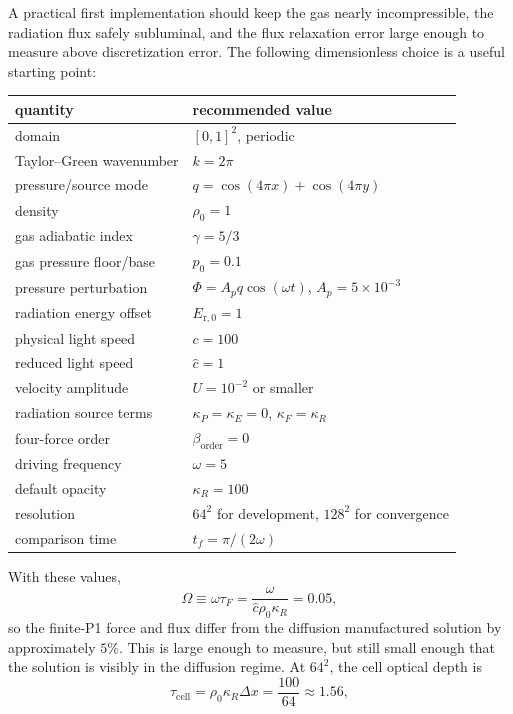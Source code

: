 \documentclass[11pt]{article}
\newcommand{\chat}{\hat{c}}
\newcommand{\Erzero}{E_{\mathrm r,0}}
\begin{document}
A practical first implementation should keep the gas nearly incompressible,
the radiation flux safely subluminal, and the flux relaxation error large
enough to measure above discretization error.  The following dimensionless
choice is a useful starting point:
\begin{center}
\begin{tabular}{ll}
\hline
quantity & recommended value \\
\hline
domain & \([0,1]^2\), periodic \\
Taylor--Green wavenumber & \(k=2\pi\) \\
pressure/source mode & \(q=\cos(4\pi x)+\cos(4\pi y)\) \\
density & \(\rho_0=1\) \\
gas adiabatic index & \(\gamma=5/3\) \\
gas pressure floor/base & \(p_0=0.1\) \\
pressure perturbation & \(\Phi=A_p q\cos(\omega t)\), \(A_p=5\times10^{-3}\) \\
radiation energy offset & \(\Erzero=1\) \\
physical light speed & \(c=100\) \\
reduced light speed & \(\chat=1\) \\
velocity amplitude & \(U=10^{-2}\) or smaller \\
radiation source terms & \(\kappa_P=\kappa_E=0\), \(\kappa_F=\kappa_R\) \\
four-force order & \(\beta_{\mathrm{order}}=0\) \\
driving frequency & \(\omega=5\) \\
default opacity & \(\kappa_R=100\) \\
resolution & \(64^2\) for development, \(128^2\) for convergence \\
comparison time & \(t_f=\pi/(2\omega)\) \\
\hline
\end{tabular}
\end{center}
With these values,
\begin{equation}
  \Omega \equiv \omega\tau_F
  = \frac{\omega}{\chat\rho_0\kappa_R}
  = 0.05,
  \label{eq:recommended-omega}
\end{equation}
so the finite-P1 force and flux differ from the diffusion manufactured
solution by approximately \(5\%\).  This is large enough to measure, but still
small enough that the solution is visibly in the diffusion regime.  At
\(64^2\), the cell optical depth is
\begin{equation}
  \tau_{\mathrm{cell}}=\rho_0\kappa_R\Delta x = \frac{100}{64}\approx1.56,
  \label{eq:recommended-cell-tau}
\end{equation}
\end{document}
